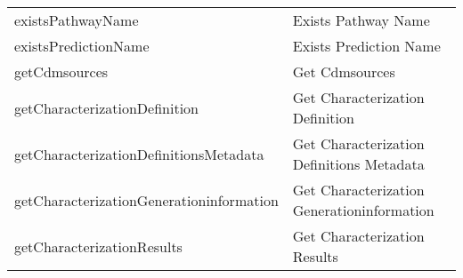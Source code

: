 \documentclass[
]{article}
\begin{document}
\begin{longtable}[]{@{}ll@{}}
\begin{minipage}[t]{0.46\columnwidth}\raggedright
existsPathwayName\strut
\end{minipage} & \begin{minipage}[t]{0.48\columnwidth}\raggedright
Exists Pathway Name\strut
\end{minipage}\tabularnewline
\begin{minipage}[t]{0.46\columnwidth}\raggedright
existsPredictionName\strut
\end{minipage} & \begin{minipage}[t]{0.48\columnwidth}\raggedright
Exists Prediction Name\strut
\end{minipage}\tabularnewline
\begin{minipage}[t]{0.46\columnwidth}\raggedright
getCdmsources\strut
\end{minipage} & \begin{minipage}[t]{0.48\columnwidth}\raggedright
Get Cdmsources\strut
\end{minipage}\tabularnewline
\begin{minipage}[t]{0.46\columnwidth}\raggedright
getCharacterizationDefinition\strut
\end{minipage} & \begin{minipage}[t]{0.48\columnwidth}\raggedright
Get Characterization Definition\strut
\end{minipage}\tabularnewline
\begin{minipage}[t]{0.46\columnwidth}\raggedright
getCharacterizationDefinitionsMetadata\strut
\end{minipage} & \begin{minipage}[t]{0.48\columnwidth}\raggedright
Get Characterization Definitions Metadata\strut
\end{minipage}\tabularnewline
\begin{minipage}[t]{0.46\columnwidth}\raggedright
getCharacterizationGenerationinformation\strut
\end{minipage} & \begin{minipage}[t]{0.48\columnwidth}\raggedright
Get Characterization Generationinformation\strut
\end{minipage}\tabularnewline
\begin{minipage}[t]{0.46\columnwidth}\raggedright
getCharacterizationResults\strut
\end{minipage} & \begin{minipage}[t]{0.48\columnwidth}\raggedright
Get Characterization Results\strut
\end{minipage}\tabularnewline

\end{longtable}
\end{document}
